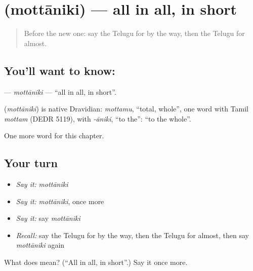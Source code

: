 \section[\texorpdfstring{\te{మొత్తానికి} (mottāniki)}{మొత్తానికి (mottāniki)}]{ (mottāniki) — all in all, in short}

\label{lesson:TE-C294-mottaniki}



\begin{quote}
Before the new one: say the Telugu for by the way, then the Telugu for almost.
\end{quote}

\subsection*{You'll want to know: }
\textbf{} — \emph{mottāniki} — \textquotedblleft{}all in all, in short\textquotedblright{}.

\begin{cousinweb}
\textbf{} (\emph{mottāniki}) is native Dravidian: \emph{mottamu}, \textquotedblleft{}total, whole\textquotedblright{}, one word with Tamil \emph{mottam} (DEDR 5119), with \emph{-āniki}, \textquotedblleft{}to the\textquotedblright{}: \textquotedblleft{}to the whole\textquotedblright{}.
\end{cousinweb}

\begin{grammarlens}[title={What you've built}]
One more word for this chapter.
\end{grammarlens}

\subsection*{Your turn}
\begin{itemize}
\raggedright
  \item \emph{Say it:} \emph{mottāniki}
  \item \emph{Say it:} \emph{mottāniki}, once more
  \item \emph{Say it:} say \emph{mottāniki}
  \item \emph{Recall:} say the Telugu for by the way, then the Telugu for almost, then say \emph{mottāniki} again
\end{itemize}

\begin{tcolorbox}[breakable,colback=teal!4,colframe=teal!35!black,title={Before you move on}]
What does  mean? (\textquotedblleft{}All in all, in short\textquotedblright{}.) Say it once more.
\end{tcolorbox}
